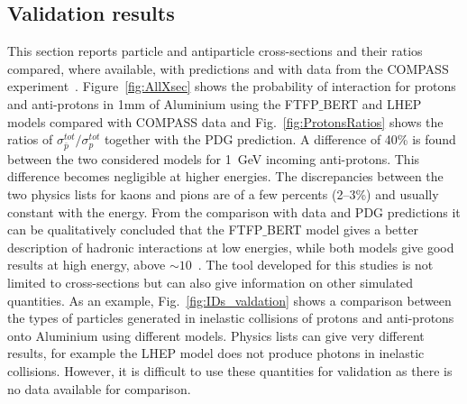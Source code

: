 \subsection{Validation results}

This section reports particle and antiparticle cross-sections and their ratios
compared, where available, with predictions and with data from the COMPASS experiment~\cite{Abbon:2007pq}.
%
Figure~\ref{fig:AllXsec} shows the probability of interaction for protons and anti-protons in 1mm of Aluminium
using the FTFP$\_$BERT and LHEP models compared with COMPASS data
and Fig.~\ref{fig:ProtonsRatios} shows the ratios of $\sigma^{tot}_{\bar{p}} / \sigma^{tot}_{p}$
together with the PDG prediction. 
%
A difference of 40\% is found between the two considered models for 1~GeV incoming anti-protons.
This difference becomes negligible at higher energies. The discrepancies between the two physics lists
for kaons and pions are of a few percents (2--3\%) and usually constant with the energy. From the comparison 
with data and PDG predictions it can be qualitatively concluded that the FTFP$\_$BERT model gives a better
description of hadronic interactions at low energies, while both models give good results at high energy, above $\sim10$~\gev.
%
The tool developed for this studies is not limited to cross-sections but can also give information on other simulated quantities.
As an example, Fig.~\ref{fig:IDs_valdation} shows a comparison between the types of particles generated in inelastic
collisions of protons and anti-protons onto Aluminium using different models. Physics lists can give very different results, 
for example the LHEP model does not produce photons in inelastic collisions. However, it is difficult to use these
quantities for validation as there is no data available for comparison.


